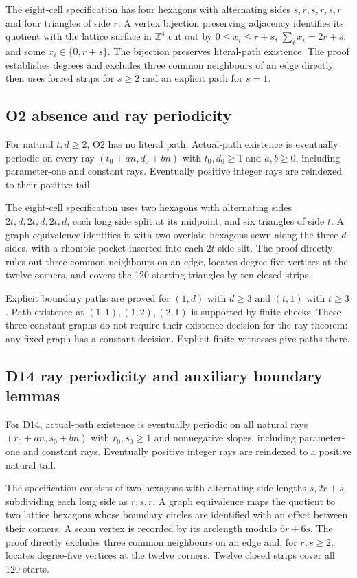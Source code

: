 \documentclass[11pt]{amsart}
\theoremstyle{definition}\newtheorem{definition}{Definition}
\begin{document}
The eight-cell specification has four hexagons with alternating sides
$s,r,s,r,s,r$ and four triangles of side $r$. A vertex bijection preserving adjacency identifies
its quotient with the lattice surface in $\mathbb Z^4$ cut out by
$0\le x_i\le r+s$, $\sum_i x_i=2r+s$, and some $x_i\in\{0,r+s\}$.
The bijection preserves literal-path existence. The proof establishes degrees and excludes three common
neighbours of an edge directly, then uses forced strips for $s\ge2$
and an explicit path for $s=1$.

\subsection{O2 absence and ray periodicity}\label{sec:o2-formal}
For natural $t,d\ge2$, O2 has no literal path. Actual-path existence
is eventually periodic on every ray $(t_0+an,d_0+bn)$ with
$t_0,d_0\ge1$ and $a,b\ge0$, including parameter-one and constant
rays. Eventually positive integer rays are reindexed to their
positive tail.

The eight-cell specification uses two hexagons with alternating sides
$2t,d,2t,d,2t,d$, each long side split at its midpoint, and six triangles
of side $t$. A graph equivalence identifies it
with two overlaid hexagons sewn along the three $d$-sides, with a rhombic
pocket inserted into each $2t$-side slit. The proof directly rules out
three common neighbours on an edge, locates degree-five vertices at the
twelve corners, and covers the 120 starting triangles by ten closed
strips.

Explicit boundary paths are proved for $(1,d)$ with $d\ge3$ and
$(t,1)$ with $t\ge3$. Path existence at $(1,1),(1,2),(2,1)$ is supported by finite checks. These three constant graphs do not
require their existence decision for the ray theorem: any fixed graph
has a constant decision. Explicit finite witnesses give paths there.

\subsection{D14 ray periodicity and auxiliary boundary lemmas}\label{sec:d14-formal}
For D14, actual-path existence is eventually periodic on all natural
rays $(r_0+an,s_0+bn)$ with $r_0,s_0\ge1$ and nonnegative slopes,
including parameter-one and constant rays. Eventually positive
integer rays are reindexed to a positive natural tail.

The specification consists of two hexagons with alternating side lengths
$s,2r+s$, subdividing each long side as $r,s,r$. A graph
equivalence maps the quotient to two lattice hexagons
whose boundary circles are identified with an offset between their
corners. A seam vertex is recorded by its arclength modulo $6r+6s$.
The proof directly excludes three common neighbours on an edge and,
for $r,s\ge2$, locates degree-five vertices at the twelve corners.
Twelve closed strips cover all 120 starts.
\end{document}

